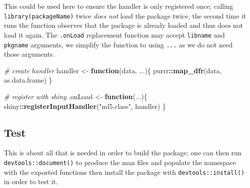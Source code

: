 \documentclass[10pt,]{krantz}
\makeatletter
\newenvironment{Shaded}{\begin{snugshade}}{\end{snugshade}}
\newcommand{\CommentTok}[1]{\textcolor[rgb]{0.37,0.37,0.37}{\textit{#1}}}
\newcommand{\ControlFlowTok}[1]{\textcolor[rgb]{0.27,0.27,0.27}{\textbf{#1}}}
\newcommand{\KeywordTok}[1]{\textcolor[rgb]{0.27,0.27,0.27}{\textbf{#1}}}
\newcommand{\NormalTok}[1]{#1}
\newcommand{\OperatorTok}[1]{\textcolor[rgb]{0.43,0.43,0.43}{\textbf{#1}}}
\newcommand{\StringTok}[1]{\textcolor[rgb]{0.5,0.5,0.5}{#1}}
\newenvironment{kframe}{%
\medskip{}
\setlength{\fboxsep}{.8em}
 \def\at@end@of@kframe{}%
 \ifinner\ifhmode%
  \def\at@end@of@kframe{\end{minipage}}%
  \begin{minipage}{\columnwidth}%
 \fi\fi%
 \def\FrameCommand##1{\hskip\@totalleftmargin \hskip-\fboxsep
 \colorbox{shadecolor}{##1}\hskip-\fboxsep
     \hskip-\linewidth \hskip-\@totalleftmargin \hskip\columnwidth}%
 \MakeFramed {\advance\hsize-\width
   \@totalleftmargin\z@ \linewidth\hsize
   \@setminipage}}%
 {\par\unskip\endMakeFramed%
 \at@end@of@kframe}
\renewenvironment{Shaded}{\begin{kframe}}{\end{kframe}}
\makeatother
\begin{document}
This could be used here to ensure the handler is only registered once; calling \texttt{library(packageName)} twice \emph{does not} load the package twice, the second time it runs the function observes that the package is already loaded and thus does not load it again. The \texttt{.onLoad} replacement function may accept \texttt{libname} and \texttt{pkgname} arguments, we simplify the function to using \texttt{...} as we do not need those arguments.

\begin{Shaded}
\begin{Highlighting}[]
\CommentTok{# create handler}
\NormalTok{handler <-}\StringTok{ }\ControlFlowTok{function}\NormalTok{(data, ...)\{}
\NormalTok{  purrr}\OperatorTok{::}\KeywordTok{map_dfr}\NormalTok{(data, as.data.frame)}
\NormalTok{\}}

\CommentTok{# register with shiny}
\NormalTok{.onLoad <-}\StringTok{ }\ControlFlowTok{function}\NormalTok{(...)\{}
\NormalTok{  shiny}\OperatorTok{::}\KeywordTok{registerInputHandler}\NormalTok{(}\StringTok{"ml5.class"}\NormalTok{, handler)}
\NormalTok{\}}
\end{Highlighting}
\end{Shaded}

\hypertarget{shiny-complete-pkg-test}{%
\subsection{Test}\label{shiny-complete-pkg-test}}

This is about all that is needed in order to build the package; one can then run \texttt{devtools::document()} to produce the man files and populate the namespace with the exported functions then install the package with \texttt{devtools::install()} in order to test it.
\end{document}
